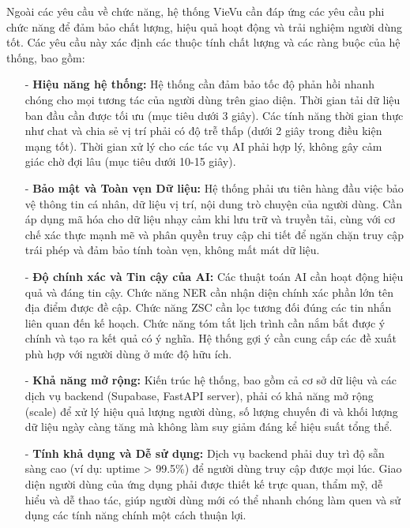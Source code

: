 Ngoài các yêu cầu về chức năng, hệ thống VieVu cần đáp ứng các yêu cầu phi chức năng để đảm bảo chất lượng, hiệu quả hoạt động và trải nghiệm người dùng tốt. Các yêu cầu này xác định các thuộc tính chất lượng và các ràng buộc của hệ thống, bao gồm:

\begin{itemize}
    \item[-] \textbf{Hiệu năng hệ thống:} Hệ thống cần đảm bảo tốc độ phản hồi nhanh chóng cho mọi tương tác của người dùng trên giao diện. Thời gian tải dữ liệu ban đầu cần được tối ưu (mục tiêu dưới 3 giây). Các tính năng thời gian thực như chat và chia sẻ vị trí phải có độ trễ thấp (dưới 2 giây trong điều kiện mạng tốt). Thời gian xử lý cho các tác vụ AI phải hợp lý, không gây cảm giác chờ đợi lâu (mục tiêu dưới 10-15 giây).

    \item[-] \textbf{Bảo mật và Toàn vẹn Dữ liệu:} Hệ thống phải ưu tiên hàng đầu việc bảo vệ thông tin cá nhân, dữ liệu vị trí, nội dung trò chuyện của người dùng. Cần áp dụng mã hóa cho dữ liệu nhạy cảm khi lưu trữ và truyền tải, cùng với cơ chế xác thực mạnh mẽ và phân quyền truy cập chi tiết để ngăn chặn truy cập trái phép và đảm bảo tính toàn vẹn, không mất mát dữ liệu.

    \item[-] \textbf{Độ chính xác và Tin cậy của AI:} Các thuật toán AI cần hoạt động hiệu quả và đáng tin cậy. Chức năng NER cần nhận diện chính xác phần lớn tên địa điểm được đề cập. Chức năng ZSC cần lọc tương đối đúng các tin nhắn liên quan đến kế hoạch. Chức năng tóm tắt lịch trình cần nắm bắt được ý chính và tạo ra kết quả có ý nghĩa. Hệ thống gợi ý cần cung cấp các đề xuất phù hợp với người dùng ở mức độ hữu ích.

    \item[-] \textbf{Khả năng mở rộng:} Kiến trúc hệ thống, bao gồm cả cơ sở dữ liệu và các dịch vụ backend (Supabase, FastAPI server), phải có khả năng mở rộng (scale) để xử lý hiệu quả lượng người dùng, số lượng chuyến đi và khối lượng dữ liệu ngày càng tăng mà không làm suy giảm đáng kể hiệu suất tổng thể.

    \item[-] \textbf{Tính khả dụng và Dễ sử dụng:} Dịch vụ backend phải duy trì độ sẵn sàng cao (ví dụ: uptime > 99.5\%) để người dùng truy cập được mọi lúc. Giao diện người dùng của ứng dụng phải được thiết kế trực quan, thẩm mỹ, dễ hiểu và dễ thao tác, giúp người dùng mới có thể nhanh chóng làm quen và sử dụng các tính năng chính một cách thuận lợi.


\end{itemize}

